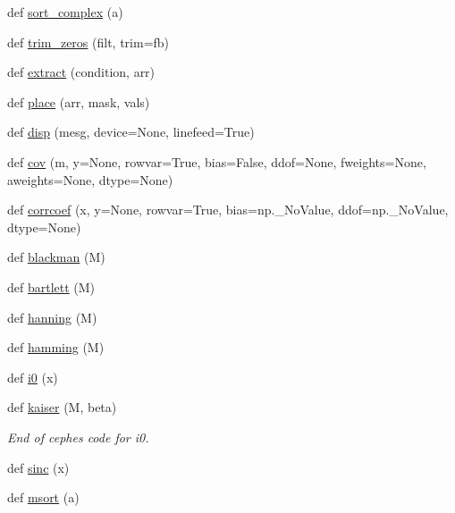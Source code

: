 \begin{DoxyCompactItemize}
def \hyperlink{namespacenumpy_1_1lib_1_1function__base_a3c45c0ca46a8e4e0474d172a415cd48e}{sort\+\_\+complex} (a)
\item 
def \hyperlink{namespacenumpy_1_1lib_1_1function__base_a25cae3cdf5408e8248743303aed46291}{trim\+\_\+zeros} (filt, trim=\textquotesingle{}fb\textquotesingle{})
\item 
def \hyperlink{namespacenumpy_1_1lib_1_1function__base_a101a3499fc1bf6b3358d526f1ee44660}{extract} (condition, arr)
\item 
def \hyperlink{namespacenumpy_1_1lib_1_1function__base_a364dd8b8908a04189e7fa1383a20d7a3}{place} (arr, mask, vals)
\item 
def \hyperlink{namespacenumpy_1_1lib_1_1function__base_af46ece4284639d18b2dbef20d55b7da9}{disp} (mesg, device=None, linefeed=True)
\item 
def \hyperlink{namespacenumpy_1_1lib_1_1function__base_a9d5a9207424b666ee843b21bf1bd1c99}{cov} (m, y=None, rowvar=True, bias=False, ddof=None, fweights=None, aweights=None, dtype=None)
\item 
def \hyperlink{namespacenumpy_1_1lib_1_1function__base_a42d342f0c8b4195a01e7eb3664e77973}{corrcoef} (x, y=None, rowvar=True, bias=np.\+\_\+\+No\+Value, ddof=np.\+\_\+\+No\+Value, dtype=None)
\item 
def \hyperlink{namespacenumpy_1_1lib_1_1function__base_a0ad21c2f4a4c1666732e1958c22088db}{blackman} (M)
\item 
def \hyperlink{namespacenumpy_1_1lib_1_1function__base_a56b919ac5a2558c47bbedede77bfb474}{bartlett} (M)
\item 
def \hyperlink{namespacenumpy_1_1lib_1_1function__base_a7eab0ac591d5443267a7e956237e3daf}{hanning} (M)
\item 
def \hyperlink{namespacenumpy_1_1lib_1_1function__base_a38552a5a9da7a9b9fb0d48354b2a3e3b}{hamming} (M)
\item 
def \hyperlink{namespacenumpy_1_1lib_1_1function__base_accd5688c3b4cd85fab84aa78e4d07d55}{i0} (x)
\item 
def \hyperlink{namespacenumpy_1_1lib_1_1function__base_a0b737aa5318d54e6314310ff0358166b}{kaiser} (M, beta)
\begin{DoxyCompactList}\small\item\em End of cephes code for i0. \end{DoxyCompactList}\item 
def \hyperlink{namespacenumpy_1_1lib_1_1function__base_a83338bd07f78cb8166c23d97fffbf33e}{sinc} (x)
\item 
def \hyperlink{namespacenumpy_1_1lib_1_1function__base_a9d1bb717d2bf83599bec71b70ca2b47c}{msort} (a)

\end{DoxyCompactItemize}
